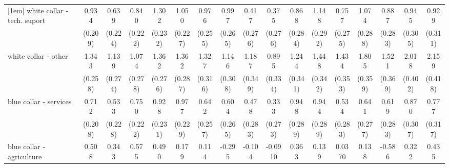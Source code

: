 {\begin{tabular}{l*{16}{c}}
[1em]
white collar - tech. suport&       0.934\sym{***}&       0.639\sym{**} &       0.840\sym{***}&       1.302\sym{***}&       1.050\sym{***}&       0.976\sym{***}&       0.997\sym{***}&       0.417         &       0.375         &       0.868\sym{**} &       1.148\sym{***}&       0.757\sym{**} &       1.074\sym{***}&       0.887\sym{**} &       0.945\sym{**} &       0.929\sym{**} \\
                    &     (0.209)         &     (0.224)         &     (0.222)         &     (0.232)         &     (0.227)         &     (0.255)         &     (0.265)         &     (0.276)         &     (0.276)         &     (0.284)         &     (0.292)         &     (0.275)         &     (0.288)         &     (0.283)         &     (0.305)         &     (0.311)         \\
[1em]
white collar - other&       1.343\sym{***}&       1.139\sym{***}&       1.074\sym{***}&       1.362\sym{***}&       1.362\sym{***}&       1.327\sym{***}&       1.146\sym{***}&       1.187\sym{***}&       0.895\sym{**} &       1.244\sym{***}&       1.448\sym{***}&       1.434\sym{***}&       1.805\sym{***}&       1.521\sym{***}&       2.018\sym{***}&       2.159\sym{***}\\
                    &     (0.258)         &     (0.274)         &     (0.278)         &     (0.276)         &     (0.287)         &     (0.316)         &     (0.308)         &     (0.349)         &     (0.334)         &     (0.341)         &     (0.342)         &     (0.353)         &     (0.359)         &     (0.369)         &     (0.402)         &     (0.418)         \\
[1em]
blue collar - services&       0.712\sym{***}&       0.533\sym{*}  &       0.750\sym{***}&       0.928\sym{***}&       0.977\sym{***}&       0.642\sym{*}  &       0.604\sym{*}  &       0.478         &       0.333         &       0.948\sym{**} &       0.944\sym{**} &       0.534         &       0.641\sym{*}  &       0.619\sym{*}  &       0.870\sym{**} &       0.777\sym{*}  \\
                    &     (0.208)         &     (0.228)         &     (0.222)         &     (0.231)         &     (0.229)         &     (0.257)         &     (0.265)         &     (0.283)         &     (0.273)         &     (0.289)         &     (0.289)         &     (0.283)         &     (0.277)         &     (0.283)         &     (0.307)         &     (0.317)         \\
[1em]
blue collar - agriculture&       0.508         &       0.343         &       0.575         &       0.490         &       0.179         &       0.114         &      -0.295         &      -0.104         &     -0.0910         &       0.363         &       0.139         &      0.0370         &       0.138         &      -0.586         &       0.322         &       0.435         \\

\end{tabular}}

